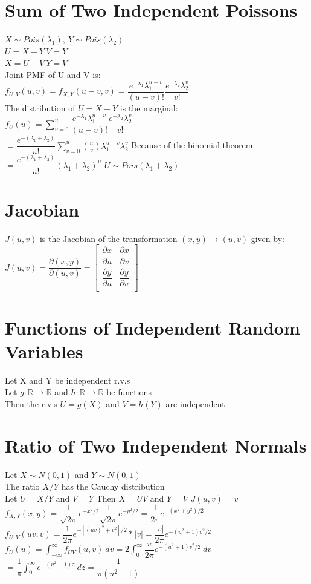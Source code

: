 \documentclass[openany]{book}
\begin{document}
\begin{flushleft}
\section{Sum of Two Independent Poissons}
$X\sim Pois(\lambda_1), \ Y\sim Pois(\lambda_2)$\\
$U=X+Y \ V=Y$\\
$X=U-V \ Y=V$\\
Joint PMF of U and V is:\\
$f_{U,V}(u,v)=f_{X,Y}(u-v,v)=\dfrac{e^{-\lambda_1}\lambda_1^{u-v}}{(u-v)!}\dfrac{e^{-\lambda_2}\lambda_2^v}{v!}$\\
The distribution of $U=X+Y$ is the marginal:\\
$f_U(u)=\sum_{v=0}^{u}\dfrac{e^{-\lambda_1}\lambda_1^{u-v}}{(u-v)!}\dfrac{e^{-\lambda_2}\lambda_2^v}{v!}$\\
$=\dfrac{e^{-(\lambda_1+\lambda_2)}}{u!}\sum_{v=0}^{u} {u \choose v}\lambda_1^{u-v}\lambda_2^v$\medbreak
Because of the binomial theorem\medbreak
$=\dfrac{e^{-(\lambda_1+\lambda_2)}}{u!}(\lambda_1+\lambda_2)^u$\medbreak
$U\sim Pois(\lambda_1+\lambda_2)$
\section{Jacobian}
$J(u,v)$ is the Jacobian of the transformation $(x,y)\to (u,v)$ given by:\medbreak
$J(u,v)=\dfrac{\partial(x,y)}{\partial(u,v)}=
\begin{bmatrix}
\dfrac{\partial x}{\partial u}& \dfrac{\partial x}{\partial v}\\
\dfrac{\partial y}{\partial u}& \dfrac{\partial y}{\partial v}\\
\end{bmatrix}$
\section{Functions of Independent Random Variables}
Let X and Y be independent r.v.s\\
Let $g:\mathbb{R}\to \mathbb{R}$ and $h:\mathbb{R}\to \mathbb{R}$ be functions\\
Then the r.v.s $U=g(X)$ and $V=h(Y)$ are independent
\section{Ratio of Two Independent Normals}
Let $X \sim N(0,1)$ and $Y\sim N(0,1)$\\
The ratio $X/Y$ has the Cauchy distribution\\
Let $U=X/Y$ and $V=Y$ \quad Then $X=UV$ and $Y=V$ \quad $J(u,v)=v$\\
$f_{X,Y}(x,y)=\dfrac{1}{\sqrt{2\pi}}e^{-x^2/2}\dfrac{1}{\sqrt{2\pi}}e^{-y^2/2}=\dfrac{1}{2\pi}e^{-(x^2+y^2)/2}$\\
$f_{U,V}(uv,v)=\dfrac{1}{2\pi}e^{-[(uv)^2+v^2]/2}*|v|=\dfrac{|v|}{2\pi}e^{-(u^2+1)v^2/2}$\\
$f_{U}(u)=\int_{-\infty}^{\infty}f_{UV}(u,v) \ dv=2\int_{0}^{\infty}\dfrac{v}{2\pi}e^{-(u^2+1)v^2/2} \ dv$\\
$=\dfrac{1}{\pi}\int_{0}^{\infty}e^{-(u^2+1)z} \ dz=\dfrac{1}{\pi(u^2+1)}$

\end{flushleft}
\end{document}
